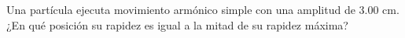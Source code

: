 \item Una partícula ejecuta movimiento armónico simple con una amplitud de $3.00\text{ cm}$. ¿En qué posición su rapidez es igual a la mitad de su rapidez máxima?